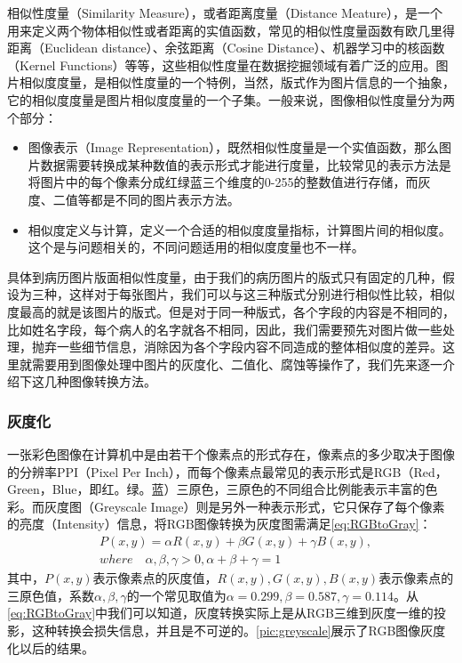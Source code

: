相似性度量（Similarity Measure）\citep{lin1998information}，或者距离度量（Distance Meature），是一个用来定义两个物体相似性或者距离的实值函数\citep{singhal2001modern}，常见的相似性度量函数有欧几里得距离（Euclidean distance）\citep{wiki:Euclidean-distance}、余弦距离（Cosine Distance）\citep{wiki:Cosine-distance}、机器学习中的核函数（Kernel Functions）\citep{hofmann2008kernel}等等，这些相似性度量在数据挖掘领域有着广泛的应用\citep{tan2006introduction}。图片相似度度量，是相似性度量的一个特例，当然，版式作为图片信息的一个抽象，它的相似度度量是图片相似度度量的一个子集。一般来说，图像相似性度量分为两个部分\citep{goldberger2003efficient}：
\begin{itemize}
  \item 图像表示（Image Representation），既然相似性度量是一个实值函数，那么图片数据需要转换成某种数值的表示形式才能进行度量，比较常见的表示方法是将图片中的每个像素分成红绿蓝三个维度的0-255的整数值进行存储，而灰度、二值等都是不同的图片表示方法。
  \item 相似度定义与计算，定义一个合适的相似度度量指标，计算图片间的相似度。这个是与问题相关的，不同问题适用的相似度度量也不一样。
\end{itemize}
具体到病历图片版面相似性度量，由于我们的病历图片的版式只有固定的几种，假设为三种，这样对于每张图片，我们可以与这三种版式分别进行相似性比较，相似度最高的就是该图片的版式。但是对于同一种版式，各个字段的内容是不相同的，比如姓名字段，每个病人的名字就各不相同，因此，我们需要预先对图片做一些处理，抛弃一些细节信息，消除因为各个字段内容不同造成的整体相似度的差异。这里就需要用到图像处理中图片的灰度化、二值化、腐蚀等操作了，我们先来逐一介绍下这几种图像转换方法。

\subsubsection*{灰度化}
\label{sub:灰度化}
一张彩色图像在计算机中是由若干个像素点的形式存在，像素点的多少取决于图像的分辨率PPI（Pixel Per Inch），而每个像素点最常见的表示形式是RGB（Red，Green，Blue，即红。绿。蓝）三原色，三原色的不同组合比例能表示丰富的色彩。而灰度图（Greyscale Image）则是另外一种表示形式，它只保存了每个像素的亮度（Intensity）信息，将RGB图像转换为灰度图需满足\autoref{eq:RGBtoGray}：
\begin{equation} \label{eq:RGBtoGray}
		\begin{split}
& P(x,y) = \alpha R(x,y) + \beta G(x,y) + \gamma B(x,y),  \\
& where \quad \alpha,\beta,\gamma > 0,\alpha + \beta + \gamma = 1
		\end{split}
\end{equation}
其中，$P(x,y)$表示像素点的灰度值，$R(x,y),G(x,y),B(x,y)$表示像素点的三原色值，系数$\alpha,\beta,\gamma$的一个常见取值为$\alpha=0.299,\beta=0.587,\gamma=0.114$。从\autoref{eq:RGBtoGray}中我们可以知道，灰度转换实际上是从RGB三维到灰度一维的投影，这种转换会损失信息，并且是不可逆的。\autoref{pic:greyscale}展示了RGB图像灰度化以后的结果。

